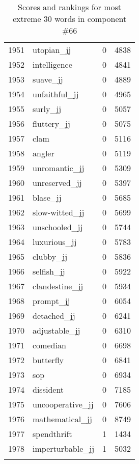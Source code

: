 \begin{longtable}[!htbp]{| rlr@{.}l |}
    1951 & utopian\_jj & 0 & 4838 \\
    1952 & intelligence & 0 & 4841 \\
    1953 & suave\_jj & 0 & 4889 \\
    1954 & unfaithful\_jj & 0 & 4965 \\
    1955 & surly\_jj & 0 & 5057 \\
    1956 & fluttery\_jj & 0 & 5075 \\
    1957 & clam & 0 & 5116 \\
    1958 & angler & 0 & 5119 \\
    1959 & unromantic\_jj & 0 & 5309 \\
    1960 & unreserved\_jj & 0 & 5397 \\
    1961 & blase\_jj & 0 & 5685 \\
    1962 & slow-witted\_jj & 0 & 5699 \\
    1963 & unschooled\_jj & 0 & 5744 \\
    1964 & luxurious\_jj & 0 & 5783 \\
    1965 & clubby\_jj & 0 & 5836 \\
    1966 & selfish\_jj & 0 & 5922 \\
    1967 & clandestine\_jj & 0 & 5934 \\
    1968 & prompt\_jj & 0 & 6054 \\
    1969 & detached\_jj & 0 & 6241 \\
    1970 & adjustable\_jj & 0 & 6310 \\
    1971 & comedian & 0 & 6698 \\
    1972 & butterfly & 0 & 6841 \\
    1973 & sop & 0 & 6934 \\
    1974 & dissident & 0 & 7185 \\
    1975 & uncooperative\_jj & 0 & 7606 \\
    1976 & mathematical\_jj & 0 & 8749 \\
    1977 & spendthrift & 1 & 1434 \\
    1978 & imperturbable\_jj & 1 & 5032 \\
    \hline
    \caption{Scores and rankings for most extreme 30 words in component \#66} \\
\end{longtable}
